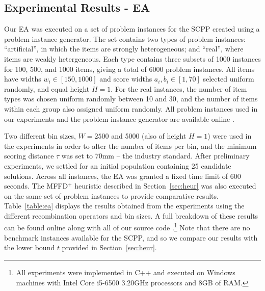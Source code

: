 \documentclass[a4paper,11pt,authoryear]{elsarticle}
\begin{document}
\subsection{Experimental Results - EA}
\label{sub:expea}

\noindent Our EA was executed on a set of problem instances for the SCPP created using a problem instance generator. The set contains two types of problem instances: ``artificial'', in which the items are strongly heterogeneous; and ``real'', where items are weakly hetergeneous. Each type contains three subsets of 1000 instances for 100, 500, and 1000 items, giving a total of 6000 problem instances. All items have widths $w_i \in [150,1000]$ and score widths $a_i, b_i \in [1,70]$ selected uniform randomly, and equal height $H=1$. For the real instances, the number of item types was chosen uniform randomly between 10 and 30, and the number of items within each group also assigned uniform randomly. All problem instances used in our experiments and the problem instance generator are available online \citep{hawa2019inst}.

Two different bin sizes, $W = 2500$ and 5000 (also of height $H=1$) were used in the experiments in order to alter the number of items per bin, and the minimum scoring distance $\tau$ was set to 70mm -- the industry standard. After preliminary experiments, we settled for an initial population containing 25 candidate solutions. Across all instances, the EA was granted a fixed time limit of 600 seconds. The MFFD$^+$ heuristic described in Section~\ref{sec:heur} was also executed on the same set of problem instances to provide comparative results. Table~\ref{table:ea} displays the results obtained from the experiments using the different recombination operators and bin sizes. A full breakdown of these results can be found online along with all of our source code \citep{hawa2019ea}.\footnote{All experiments were implemented in C++ and executed on Windows machines with Intel Core i5-6500 3.20GHz processors and 8GB of RAM.} Note that there are no benchmark instances available for the SCPP, and so we compare our results with the lower bound $t$ provided in Section~\ref{sec:heur}.
\end{document}

